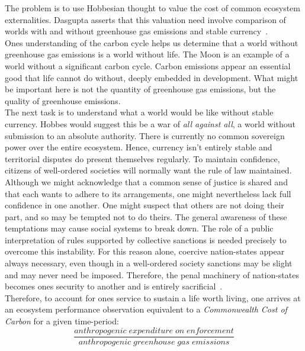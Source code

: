 \documentclass[12pt, oneside]{article}   	%
\begin{document}
The problem is to use Hobbesian thought to value the cost of common ecosystem externalities.
Dasgupta asserts that this valuation need involve comparison of worlds with and without greenhouse gas emissions and stable currency~\cite{pd2}.\\

Ones understanding of the carbon cycle helps us determine that a world without greenhouse gas emissions is a world without life.
The Moon is an example of a world without a significant carbon cycle.
Carbon emissions appear an essential good that life cannot do without, deeply embedded in development.
What might be important here is not the quantity of greenhouse gas emissions, but the quality of greenhouse emissions.\\

The next task is to understand what a world would be like without stable currency.
Hobbes would suggest this be a war of \emph{all against all}, a world without submission to an absolute authority.
There is currently no common sovereign power over the entire ecosystem.
Hence, currency isn't entirely stable and territorial disputes do present themselves regularly.
To maintain confidence, citizens of well-ordered societies will normally want the rule of law maintained.
Although we might acknowledge that a common sense of justice is shared and that each wants to adhere to its arrangements, one might nevertheless lack full confidence in one another.
One might suspect that others are not doing their part, and so may be tempted not to do theirs.
The general awareness of these temptations may cause social systems to break down.
The role of a public interpretation of rules supported by collective sanctions is needed precisely to overcome this instability.
For this reason alone, coercive nation-states appear always necessary, even though in a well-ordered society sanctions may be slight and may never need be imposed.
Therefore, the penal machinery of nation-states becomes ones security to another and is entirely sacrificial~\cite{jr1}.\\

Therefore, to account for ones service to sustain a life worth living, one arrives at an ecosystem performance observation equivalent to a \emph{Commonwealth Cost of Carbon} for a given time-period:\\

\begin{equation}
	\frac{anthropogenic\; expenditure\; on\; enforcement}{anthropogenic\; greenhouse\; gas\; emissions}
\end{equation}\\
\end{document}
